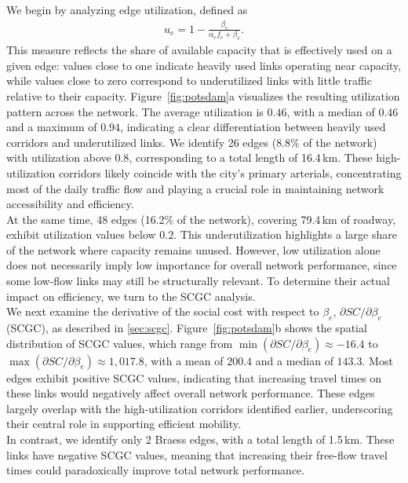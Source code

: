 \documentclass[twocolumn,english,groupedaddress, superscriptaddress,aps,pre,10pt,floatfix]{revtex4-2}
\begin{document}
We begin by analyzing edge utilization, defined as
\begin{align*}
    u_e = 1 - \frac{\beta_e}{\alpha_e f_e + \beta_e}.
\end{align*}
This measure reflects the share of available capacity that is effectively used on a given edge: values close to one indicate heavily used links operating near capacity, while values close to zero correspond to underutilized links with little traffic relative to their capacity.  
Figure~\ref{fig:potsdam}a visualizes the resulting utilization pattern across the network. 
The average utilization is $0.46$, with a median of $0.46$ and a maximum of $0.94$, indicating a clear differentiation between heavily used corridors and underutilized links. 
We identify 26 edges (8.8\% of the network) with utilization above $0.8$, corresponding to a total length of 16.4\,km. 
These high-utilization corridors likely coincide with the city’s primary arterials, concentrating most of the daily traffic flow and playing a crucial role in maintaining network accessibility and efficiency.\\

At the same time, 48 edges (16.2\% of the network), covering 79.4\,km of roadway, exhibit utilization values below $0.2$. 
This underutilization highlights a large share of the network where capacity remains unused. 
However, low utilization alone does not necessarily imply low importance for overall network performance, since some low-flow links may still be structurally relevant. 
To determine their actual impact on efficiency, we turn to the SCGC analysis.\\

We next examine the derivative of the social cost with respect to $\beta_e$, $\partial SC/\partial \beta_e$ (SCGC), as described in \cref{sec:scgc}. 
Figure~\ref{fig:potsdam}b shows the spatial distribution of SCGC values, which range from $\min(\partial SC/\partial \beta_e) \approx -16.4$ to $\max(\partial SC/\partial \beta_e) \approx 1{,}017.8$, with a mean of $200.4$ and a median of $143.3$. 
Most edges exhibit positive SCGC values, indicating that increasing travel times on these links would negatively affect overall network performance. 
These edges largely overlap with the high-utilization corridors identified earlier, underscoring their central role in supporting efficient mobility.\\

In contrast, we identify only 2 Braess edges, with a total length of 1.5\,km. 
These links have negative SCGC values, meaning that increasing their free-flow travel times could paradoxically improve total network performance. 
\end{document}
